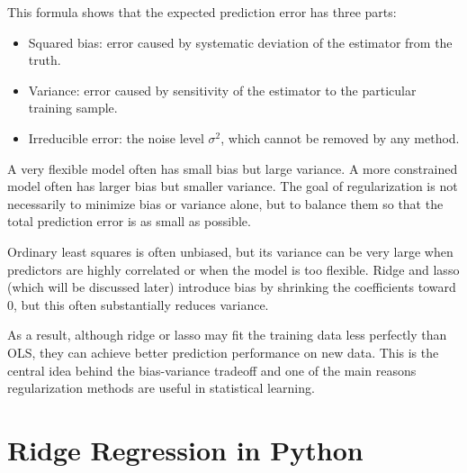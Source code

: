 \documentclass[
  letterpaper,
  DIV=11,
  numbers=noendperiod]{scrreprt}
\providecommand{\tightlist}{%
  \setlength{\itemsep}{0pt}\setlength{\parskip}{0pt}}
\theoremstyle{definition}
\theoremstyle{definition}
\theoremstyle{plain}
\theoremstyle{plain}
\theoremstyle{remark}
\begin{document}
This formula shows that the expected prediction error has three parts:

\begin{itemize}
\tightlist
\item
  Squared bias: error caused by systematic deviation of the estimator
  from the truth.
\item
  Variance: error caused by sensitivity of the estimator to the
  particular training sample.
\item
  Irreducible error: the noise level \(\sigma^2\), which cannot be
  removed by any method.
\end{itemize}

A very flexible model often has small bias but large variance. A more
constrained model often has larger bias but smaller variance. The goal
of regularization is not necessarily to minimize bias or variance alone,
but to balance them so that the total prediction error is as small as
possible.

\begin{tcolorbox}[enhanced jigsaw, arc=.35mm, bottomrule=.15mm, bottomtitle=1mm, breakable, colback=white, colbacktitle=quarto-callout-note-color!10!white, colframe=quarto-callout-note-color-frame, coltitle=black, left=2mm, leftrule=.75mm, opacityback=0, opacitybacktitle=0.6, rightrule=.15mm, title=\textcolor{quarto-callout-note-color}{\faInfo}\hspace{0.5em}{Note}, titlerule=0mm, toprule=.15mm, toptitle=1mm]

Ordinary least squares is often unbiased, but its variance can be very
large when predictors are highly correlated or when the model is too
flexible. Ridge and lasso (which will be discussed later) introduce bias
by shrinking the coefficients toward \(0\), but this often substantially
reduces variance.

As a result, although ridge or lasso may fit the training data less
perfectly than OLS, they can achieve better prediction performance on
new data. This is the central idea behind the bias-variance tradeoff and
one of the main reasons regularization methods are useful in statistical
learning.

\end{tcolorbox}

\section{Ridge Regression in Python}\label{ridge-regression-in-python}
\end{document}
